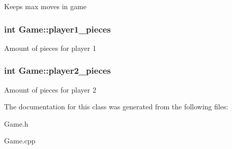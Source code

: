 Keeps max moves in game \hypertarget{class_game_aea2c7f8bdb891f32026750c81f6eac16}{
\subsubsection[{player1\-\_\-pieces}]{\setlength{\rightskip}{0pt plus 5cm}int Game\-::player1\-\_\-pieces\hspace{0.3cm}{\ttfamily [protected]}}}\label{class_game_aea2c7f8bdb891f32026750c81f6eac16}
Amount of pieces for player 1 \hypertarget{class_game_a2b82ab082220d93bab2d7d1d181ad639}{
\subsubsection[{player2\-\_\-pieces}]{\setlength{\rightskip}{0pt plus 5cm}int Game\-::player2\-\_\-pieces\hspace{0.3cm}{\ttfamily [protected]}}}\label{class_game_a2b82ab082220d93bab2d7d1d181ad639}
Amount of pieces for player 2 

The documentation for this class was generated from the following files\-:\begin{DoxyCompactItemize}
\item 
Game.\-h\item 
Game.\-cpp\end{DoxyCompactItemize}
